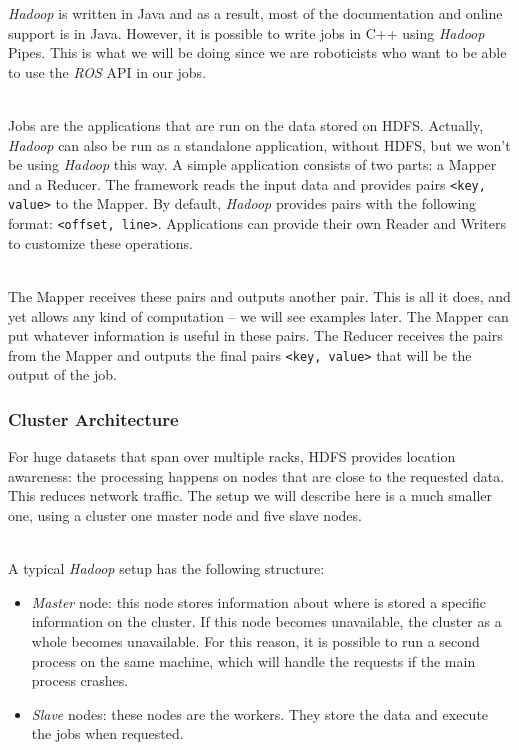 \documentclass[a4paper, 12pt]{article}
\begin{document}
\textit{Hadoop} is written in Java and as a result, most of the documentation and online support is in Java. However, it is possible to write jobs in C++ using \textit{Hadoop} Pipes. This is what we will be doing since we are roboticists who want to be able to use the \textit{ROS} API in our jobs.

~\\
Jobs are the applications that are run on the data stored on HDFS. Actually, \textit{Hadoop} can also be run as a standalone application, without HDFS, but we won't be using \textit{Hadoop} this way. A simple application consists of two parts: a Mapper and a Reducer. The framework reads the input data and provides pairs \texttt{<key, value>} to the Mapper. By default, \textit{Hadoop} provides pairs with the following format: \texttt{<offset, line>}. Applications can provide their own Reader and Writers to customize these operations.

~\\
The Mapper receives these pairs and outputs another pair. This is all it does, and yet allows any kind of computation -- we will see examples later. The Mapper can put whatever information is useful in these pairs. The Reducer receives the pairs from the Mapper and outputs the final pairs \texttt{<key, value>} that will be the output of the job.

    \subsubsection{Cluster Architecture}

For huge datasets that span over multiple racks, HDFS provides location awareness: the processing happens on nodes that are close to the requested data. This reduces network traffic. The setup we will describe here is a much smaller one, using a cluster one master node and five slave nodes.

~\\
A typical \textit{Hadoop} setup has the following structure:
\begin{itemize}
  \item \textit{Master} node: this node stores information about where is stored a specific information on the cluster. If this node becomes unavailable, the cluster as a whole becomes unavailable. For this reason, it is possible to run a second process on the same machine, which will handle the requests if the main process crashes.
  \item \textit{Slave} nodes: these nodes are the workers. They store the data and execute the jobs when requested.
\end{itemize}
\end{document}
